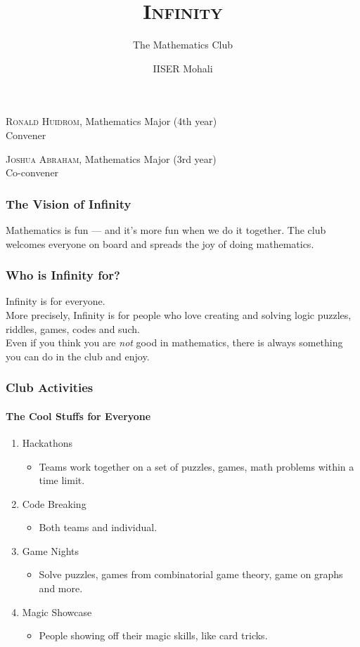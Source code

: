 \documentclass[10pt, aspectratio=43,leqno]{beamer}
\title{\textsc{Infinity}}
\subtitle{The Mathematics Club}
\author{IISER Mohali}
\begin{document}
\begin{frame}
  \titlepage
\end{frame}

\begin{frame}
  \textsc{Ronald Huidrom}, Mathematics Major (4th year) \\
  {\color{blue} Convener} \\
  \vspace*{.5cm}
  
  \textsc{Joshua Abraham}, Mathematics Major (3rd year) \\
  {\color{blue} Co-convener} \\
\end{frame}

\begin{frame}
  \frametitle{The Vision of Infinity}
  Mathematics is fun --- and it's more fun when we do it together. The club welcomes everyone on board and spreads the joy of doing mathematics. \\
\end{frame}

\begin{frame}
  \frametitle{Who is Infinity for?}
  \pause
  Infinity is for everyone. \pause \\
  \vspace*{.5cm}
  More precisely, Infinity is for people who love creating and solving logic puzzles, riddles, games, codes and such. \pause\\
  \vspace*{.5cm}
  Even if you think you are \emph{not} good in mathematics, there is always something you can do in the club and enjoy.
\end{frame}

\begin{frame}
  \frametitle{Club Activities}
  \framesubtitle{The Cool Stuffs for Everyone}
  \pause
\begin{enumerate}
\item\label{item:1} Hackathons 
\begin{itemize}
\item\label{item:2} Teams work together on a set of puzzles, games, math problems within a time limit.
\end{itemize}
\pause
\item\label{item:3} Code Breaking 
\begin{itemize}
\item Both teams and individual.
\end{itemize}
\pause
\item\label{item:4} Game Nights 
\begin{itemize}
\item Solve puzzles, games from combinatorial game theory, game on graphs and more.
\end{itemize}
\pause 
\item\label{item:5} Magic Showcase 
\begin{itemize}
\item People showing off their magic skills, like card tricks.
\end{itemize}
\end{enumerate}
\end{frame}
\end{document}
